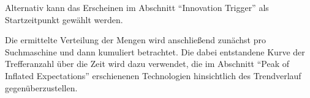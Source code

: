 Alternativ kann das Erscheinen im Abschnitt "`Innovation Trigger"' als Startzeitpunkt gewählt werden.

Die ermittelte Verteilung der Mengen wird anschließend zunächst pro Suchmaschine und dann kumuliert betrachtet. Die dabei entstandene Kurve der Trefferanzahl über die Zeit wird dazu verwendet, die im Abschnitt "`Peak of Inflated Expectations"' erschienenen Technologien hinsichtlich des Trendverlauf gegenüberzustellen.
